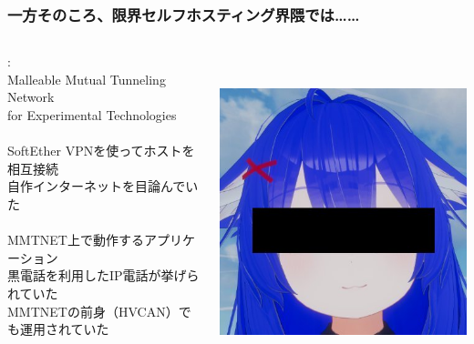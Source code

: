 \documentclass[
  lualatex,
  aspectratio=169,
  14pt
]{beamer}
\begin{document}
\begin{frame}
  \frametitle{一方そのころ、限界セルフホスティング界隈では……}

  \begin{columns}[c]
    \begin{column}[c]{.80\textwidth}
      :\\
      \hspace{1.5\zw}Malleable Mutual Tunneling Network\\
      \hspace{1.5\zw}for Experimental Technologies
      \\~\\[-.5\baselineskip]

      SoftEther VPNを使ってホストを相互接続\\
      \hspace{1.5\zw}自作インターネットを目論んでいた
      \\~\\[-.5\baselineskip]

      MMTNET上で動作するアプリケーション\\
      \hspace{1.5\zw}黒電話を利用したIP電話が挙げられていた\\
      \hspace{1.5\zw}MMTNETの前身（HVCAN）でも運用されていた
    \end{column}
    \begin{column}{.17\textwidth}
      \centering
      \\~\\[-.75\baselineskip]
      \includegraphics[width=\linewidth]{./images/pepepper.jpg}


\end{column}
\end{columns}
\end{frame}
\end{document}
